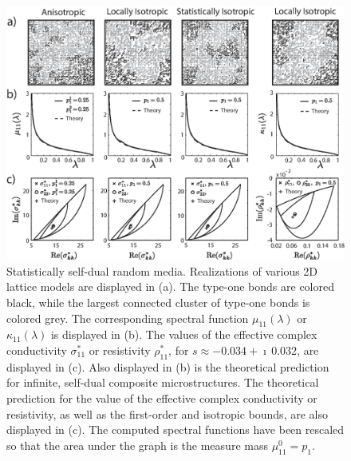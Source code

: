 \documentclass{cmslatex}
\begin{document}
%
%
\begin{figure}[t]
  \centerline{\includegraphics[scale=0.69]{A_Duality_RRN_11.eps}}
\caption{Statistically self-dual random media. Realizations of various 
  2D lattice models are displayed in (a). The type-one
  bonds are colored black, while the largest connected cluster of
  type-one bonds is colored grey. The corresponding spectral function
  $\mu_{11}(\lambda)$ or $\kappa_{11}(\lambda)$ is displayed in (b). The values of the
  effective complex conductivity $\sigma^*_{11}$ or resistivity $\rho^*_{11}$,
  for $s\approx-0.034+\imath\,0.032$, are displayed in (c). Also displayed in
  (b) is the theoretical prediction for infinite, self-dual composite
  microstructures. The theoretical prediction for 
  the value of the effective complex conductivity or resistivity, as
  well as the first-order and isotropic bounds, are also displayed in
  (c). The computed spectral functions have been rescaled so that the
  area under the graph is the measure mass $\mu^0_{11}=p_1$.                
        }
\label{fig:Duality_RRN_11}
\end{figure}
%
\end{document}
